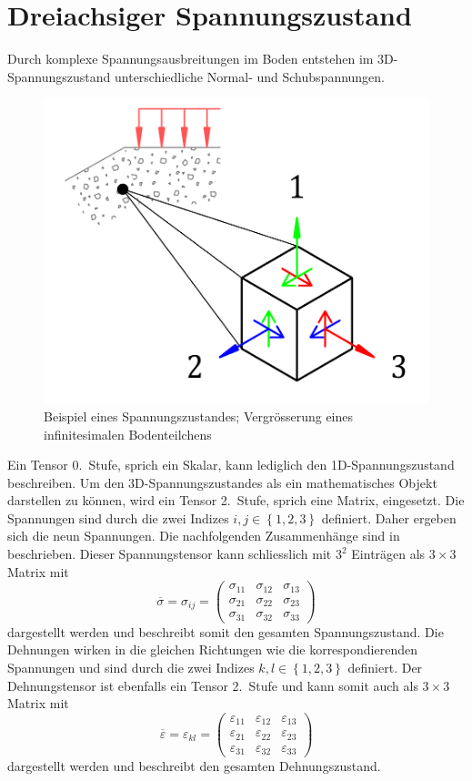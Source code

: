 \section{Dreiachsiger Spannungszustand\label{spannung:section:Dreiachsiger_Spannungszustand}}
Durch komplexe Spannungsausbreitungen im Boden entstehen im 3D-Spannungszustand unterschiedliche Normal- und Schubspannungen.
\begin{figure}
	\centering
	\includegraphics[width=0.30\linewidth,keepaspectratio]{papers/spannung/Grafiken/infinitesimalerWuerfel.png}
	\caption{Beispiel eines Spannungszustandes; Vergrösserung eines infinitesimalen Bodenteilchens}
	\label{fig:infinitesimalerWuerfel}
\end{figure}
Ein Tensor 0.~Stufe, sprich ein Skalar, kann lediglich den 1D-Spannungszustand beschreiben.
Um den 3D-Spannungszustandes als ein mathematisches Objekt darstellen zu können, wird ein Tensor 2.~Stufe, sprich eine Matrix, eingesetzt.
Die Spannungen sind durch die zwei Indizes
\(
i, j\in\left\{1, 2, 3\right\}
\)
definiert.
Daher ergeben sich die neun Spannungen.
Die nachfolgenden Zusammenhänge sind in \cite{spannung:Voigtsche-Notation} beschrieben.
Dieser Spannungstensor kann schliesslich mit $3^2$ Einträgen als $3\times3$ Matrix mit
\[
\overline{\sigma}
=
\sigma_{ij}
=
\begin{pmatrix}
	\sigma_{11} & \sigma_{12} & \sigma_{13} \\ 
	\sigma_{21} & \sigma_{22} & \sigma_{23} \\
	\sigma_{31} & \sigma_{32} & \sigma_{33}
\end{pmatrix}
\]
dargestellt werden und beschreibt somit den gesamten Spannungszustand.
Die Dehnungen wirken in die gleichen Richtungen wie die korrespondierenden Spannungen und sind durch die zwei Indizes
\(
k, l\in\left\{1, 2, 3\right\}
\)
definiert.
Der Dehnungstensor ist ebenfalls ein Tensor 2.~Stufe und kann somit auch als $3\times3$ Matrix mit
\[
\overline{\varepsilon}
=
\varepsilon_{kl}
=
\begin{pmatrix}
	\varepsilon_{11} & \varepsilon_{12} & \varepsilon_{13} \\ 
	\varepsilon_{21} & \varepsilon_{22} & \varepsilon_{23} \\
	\varepsilon_{31} & \varepsilon_{32} & \varepsilon_{33}
\end{pmatrix}
\]
dargestellt werden und beschreibt den gesamten Dehnungszustand.

